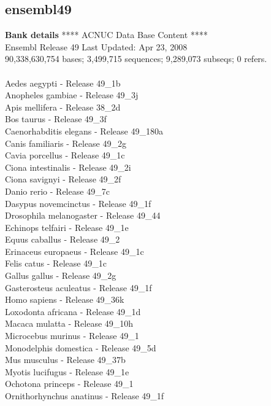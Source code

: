 \documentclass{article}
\begin{document}
\begin{Schunk}
\section{ ensembl49 }
\textbf{Bank details}
             ****     ACNUC Data Base Content      ****\\
             Ensembl Release 49	     		 Last Updated: Apr 23, 2008\\
90,338,630,754 bases; 3,499,715 sequences; 9,289,073 subseqs; 0 refers.\\
\\
 Aedes aegypti - Release 49\_1b \\
 Anopheles gambiae - Release 49\_3j \\
 Apis mellifera - Release 38\_2d \\
 Bos taurus - Release 49\_3f \\
 Caenorhabditis elegans - Release 49\_180a \\
 Canis familiaris - Release 49\_2g \\
 Cavia porcellus - Release 49\_1c \\
 Ciona intestinalis - Release 49\_2i \\
 Ciona savignyi - Release 49\_2f \\
 Danio rerio - Release 49\_7c \\
 Dasypus novemcinctus - Release 49\_1f \\
 Drosophila melanogaster - Release 49\_44 \\
 Echinops telfairi - Release 49\_1e \\
 Equus caballus - Release 49\_2 \\
 Erinaceus europaeus - Release 49\_1c \\
 Felis catus - Release 49\_1c \\
 Gallus gallus - Release 49\_2g \\
 Gasterosteus aculeatus - Release 49\_1f \\
 Homo sapiens - Release 49\_36k \\
 Loxodonta africana - Release 49\_1d \\
 Macaca mulatta - Release 49\_10h \\
 Microcebus murinus - Release 49\_1 \\
 Monodelphis domestica - Release 49\_5d \\
 Mus musculus - Release 49\_37b \\
 Myotis lucifugus - Release 49\_1e \\
 Ochotona princeps - Release 49\_1 \\
 Ornithorhynchus anatinus - Release 49\_1f \\

\end{Schunk}
\end{document}
